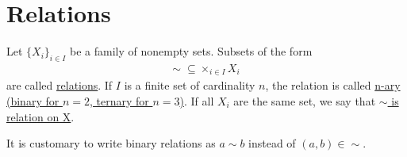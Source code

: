 \section{Relations}\label{sec:relations}

\begin{definition}\label{def:relation}
  Let $\{ X_i \}_{i \in I}$ be a family of nonempty sets.
  Subsets of the form
  \begin{align*}
    \sim\; \subseteq \times_{i \in I} X_i
  \end{align*}
  are called \uline{relations}. If $I$ is a finite set of cardinality $n$, the relation is called \uline{n-ary (binary for $n = 2$, ternary for $n = 3$)}. If all $X_i$ are the same set, we say that \uline{$\sim$ is relation on X}.

  It is customary to write binary relations as $a \sim b$ instead of $(a, b) \in \sim$.
\end{definition}

